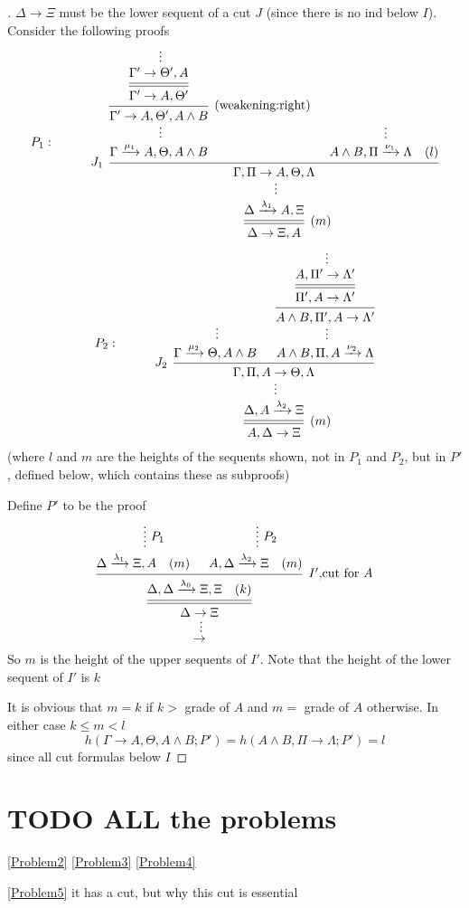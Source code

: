 \documentclass[11pt]{article}
\begin{document}
\begin{enumerate}
\begin{proof}[\cite{lemma12.8}]
\(\Delta \to \Xi\) must be the lower sequent of a cut \(J\) (since there is no ind below \(I\)).
Consider the following proofs
\begin{equation*}
P_1:\hspace{1cm}
\begin{prooftree}%
\hypo{}
\ellipsis{}{\Gamma'\to\Theta',A}
\infer[double]1{\Gamma'\to A,\Theta'}
\infer1[(weakening:right)]{\Gamma'\to A,\Theta',A\wedge B}
\ellipsis{}{\Gamma\xrightarrow{\mu_1}A,\Theta,A\wedge B}
\hypo{}
\ellipsis{}{A\wedge B,\Pi \xrightarrow{\nu_1}\Lambda\quad(l)}
\infer[left label=\(J_1\)]2{\Gamma,\Pi \to A,\Theta,\Lambda}
\ellipsis{}{\Delta \xrightarrow{\lambda_1}A,\Xi}
\infer[double]1[\((m)\)]{\Delta \to \Xi,A}
\end{prooftree}
\end{equation*}
\begin{equation*}
P_2:\hspace{1cm}
\begin{prooftree}%
\hypo{}
\ellipsis{}{\Gamma \xrightarrow{\mu_2}\Theta,A\wedge B}
\hypo{}
\ellipsis{}{A,\Pi' \to \Lambda'}
\infer[double]1{\Pi',A\to \Lambda'}
\infer1{A\wedge B,\Pi',A\to\Lambda'}
\ellipsis{}{A\wedge B,\Pi,A\xrightarrow{\nu_2}\Lambda}
\infer[left label=\(J_2\)]2{\Gamma,\Pi,A\to\Theta,\Lambda}
\ellipsis{}{\Delta,A\xrightarrow{\lambda_2}\Xi}
\infer[double] 1[\((m)\)]{A,\Delta \to \Xi}
\end{prooftree}
\end{equation*}
(where \(l\) and \(m\) are the heights of the sequents shown, not in \(P_1\) and \(P_2\), but
in \(P'\), defined below, which contains these as subproofs)

Define \(P'\) to be the proof
\begin{equation*}
\begin{prooftree}%
\hypo{}
\ellipsis{\(P_1\)}{\Delta\xrightarrow{\lambda_1}\Xi,A\quad (m)}
\hypo{}
\ellipsis{\(P_2\)}{A,\Delta\xrightarrow{\lambda_2}\Xi\quad(m)}
\infer2[\(I'\),cut for \(A\)]{\Delta,\Delta \xrightarrow{\lambda_0}\Xi,\Xi\quad(k)}
\infer[double]1{\Delta \to \Xi}
\ellipsis{}{\to}
\end{prooftree}
\end{equation*}
So \(m\) is the height of the upper sequents of \(I'\). Note that the height of the lower
sequent of \(I'\) is \(k\)

It is obvious that \(m=k\) if \(k>\) grade of \(A\) and \(m=\) grade of \(A\) otherwise. In
either case \(k\le m<l\)
\begin{equation*}
h(\Gamma\to A,\Theta,A\wedge B;P')=h(A\wedge B,\Pi\to\Lambda;P')=l
\end{equation*}
since all cut formulas below \(I\)
\end{proof}
\end{enumerate}

\section{{\bfseries\sffamily TODO} ALL the problems}
\label{sec:orgc9fa974}

\ref{Problem2}
\ref{Problem3}
\ref{Problem4}

\ref{Problem5} it has a cut, but why this cut is essential
\end{document}
